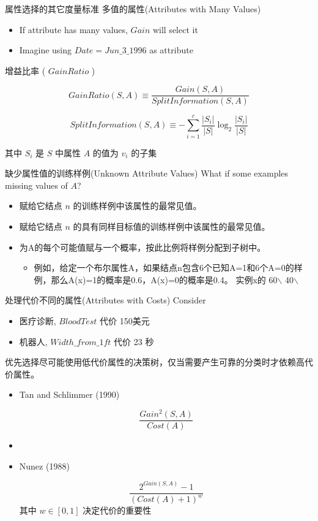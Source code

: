 \documentclass[presentation]{beamer}
\begin{document}
\begin{frame}[label={sec:org5932b8e}]{属性选择的其它度量标准}
多值的属性(Attributes with Many Values)
\begin{itemize}
\item If attribute has many values, \(Gain\) will select it
\item Imagine using \(Date = Jun\_3\_1996\) as attribute
\end{itemize}

增益比率 ( \(GainRatio\) )

\[GainRatio(S,A) \equiv \frac{Gain(S,A)}{SplitInformation(S,A)} \]

\[ SplitInformation(S,A) \equiv - \sum_{i=1}^{c} \frac{|S_{i}|}{|S|} \log_{2}\frac{|S_{i}|}{|S|} \]

其中 \(S_{i}\)  是 \(S\) 中属性 \(A\) 的值为 \(v_{i}\) 的子集
\end{frame}


\begin{frame}[label={sec:org3435e90}]{缺少属性值的训练样例(Unknown Attribute Values)}
What if some examples missing values of \(A\)?


\begin{itemize}
\item 赋给它结点 \(n\) 的训练样例中该属性的最常见值。
\item 赋给它结点 \(n\) 的具有同样目标值的训练样例中该属性的最常见值。
\item 为A的每个可能值赋与一个概率，按此比例将样例分配到子树中。
\begin{itemize}
\item 例如，给定一个布尔属性A，如果结点n包含6个已知A=1和6个A=0的样例，那么A(x)=1的概率是0.6，A(x)=0的概率是0.4。
实例x的 60$\backslash$%
40$\backslash$%
\end{itemize}
\end{itemize}
\end{frame}

\begin{frame}[label={sec:orgcc600b7}]{处理代价不同的属性(Attributes with Costs)}
Consider

\begin{itemize}
\item 医疗诊断,  \(BloodTest\) 代价 150美元
\item 机器人, \(Width\_from\_1ft\) 代价 23 秒
\end{itemize}

优先选择尽可能使用低代价属性的决策树，仅当需要产生可靠的分类时才依赖高代价属性。

\begin{itemize}
\item Tan and Schlimmer (1990)

\[\frac{Gain^{2}(S,A)}{Cost(A)}\]

\item \item Nunez (1988)

\[\frac{2^{Gain(S,A)} - 1}{(Cost(A) + 1)^{w}} \]
 其中 \(w \in [0,1]\) 决定代价的重要性
\end{itemize}
\end{frame}
\end{document}
